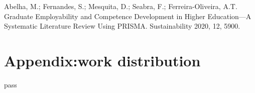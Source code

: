 \documentclass[conference]{IEEEtran}
\begin{document}


\begin{thebibliography}{00}
 Abelha, M.; Fernandes, S.; Mesquita, D.; Seabra, F.; Ferreira-Oliveira, A.T. Graduate Employability and Competence Development in Higher Education—A Systematic Literature Review Using PRISMA. Sustainability 2020, 12, 5900.
\end{thebibliography}


\section{Appendix:work distribution}
pass
\end{document}

